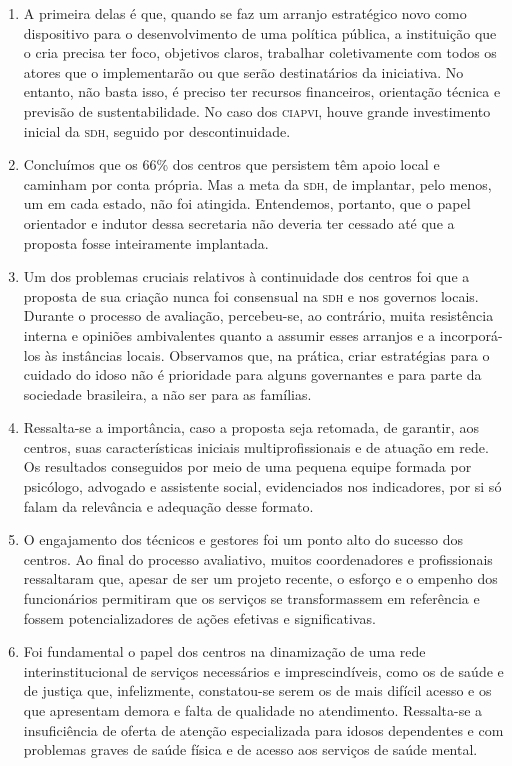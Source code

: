 \documentclass{article}
\begin{document}
\begin{enumerate}
\item
A primeira delas é que, quando se faz um arranjo estratégico novo como
dispositivo para o desenvolvimento de uma política pública, a instituição que o
cria precisa ter foco, objetivos claros, trabalhar coletivamente com todos os
atores que o implementarão ou que serão destinatários da iniciativa. No entanto,
não basta isso, é preciso ter recursos financeiros, orientação técnica e
previsão de sustentabilidade. No caso dos \textsc{ciapvi}, houve grande investimento
inicial da \textsc{sdh}, seguido por descontinuidade.

\item
Concluímos que os 66\% dos centros que persistem têm apoio local e caminham por
conta própria. Mas a meta da \textsc{sdh}, de implantar, pelo menos, um em cada estado,
não foi atingida. Entendemos, portanto, que o papel orientador e indutor dessa
secretaria não deveria ter cessado até que a proposta fosse inteiramente
implantada.

\item
Um dos problemas cruciais relativos à continuidade dos centros foi que a
proposta de sua criação nunca foi consensual na \textsc{sdh} e nos governos locais.
Durante o processo de avaliação, percebeu-se, ao contrário, muita resistência
interna e opiniões ambivalentes quanto a assumir esses arranjos e a
incorporá-los às instâncias locais. Observamos que, na prática, criar
estratégias para o cuidado do idoso não é prioridade para alguns governantes e
para parte da sociedade brasileira, a não ser para as famílias.

\item
Ressalta-se a importância, caso a proposta seja retomada, de garantir, aos
centros, suas características iniciais multiprofissionais e de atuação em rede.
Os resultados conseguidos por meio de uma pequena equipe formada por psicólogo,
advogado e assistente social, evidenciados nos indicadores, por si só falam da
relevância e adequação desse formato.

\item
O engajamento dos técnicos e gestores foi um ponto alto do sucesso dos centros.
Ao final do processo avaliativo, muitos coordenadores e profissionais
ressaltaram que, apesar de ser um projeto recente, o esforço e o empenho dos
funcionários permitiram que os serviços se transformassem em referência e fossem
potencializadores de ações efetivas e significativas.

\item
Foi fundamental o papel dos centros na dinamização de uma rede
interinstitucional de serviços necessários e imprescindíveis, como os de saúde e
de justiça que, infelizmente, constatou-se serem os de mais difícil acesso e os
que apresentam demora e falta de qualidade no atendimento. Ressalta-se a
insuficiência de oferta de atenção especializada para idosos dependentes e com
problemas graves de saúde física e de acesso aos serviços de saúde mental.


\end{enumerate}
\end{document}
